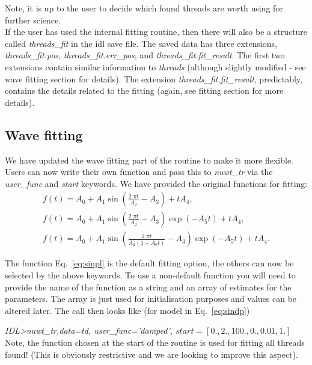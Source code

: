 \documentclass{article}
\begin{document}
Note, it is up to the user to decide which found threads are worth using for further science.\\

If the user has used the internal fitting routine, then there will also be a structure called 
\textit{threads\_fit} in the idl save file. The saved data has three extensions, \textit{threads\_fit.pos}, 
\textit{threads\_fit.err\_pos}, and  \textit{threads\_fit.fit\_result}. The first two extensions contain similar 
information to \textit{threads} (although slightly modified - see wave fitting section for details). The 
extension \textit{threads\_fit.fit\_result}, predictably, contains the details related to the fitting (again, see 
fitting section for more details).


\subsection{Wave fitting}

We have updated the wave fitting part of the routine to make it more flexible. Users can now write their own function and pass this to \textit{nuwt\_tr} via the \textit{user\_func} and \textit{start} keywords. We have provided the original functions for fitting:\\
 
\begin{eqnarray}
f(t)=A_0+A_1\sin\left( \frac{2.\pi t}{A_2}-A_3\right)+tA_4,\label{eq:sinpl}\\
f(t)=A_0+A_1\sin\left( \frac{2.\pi t}{A_2}-A_3\right)\exp(-A_5t)+tA_4,\label{eq:sindp}\\
f(t)=A_0+A_1\sin\left( \frac{2.\pi t}{A_2(1+A_6t)}-A_3\right)\exp(-A_5t)+tA_4.\label{eq:sintdp}
\end{eqnarray}

The function Eq.~\ref{eq:sinpl} is the default fitting option, the others can now be selected by the above keywords. To use a non-default function you will need to provide the name of the function as a string and an array of estimates for the parameters. The array is just used for initialisation purposes and values can be altered later. The call then looks like (for model 
in Eq.~\ref{eq:sindp})

\medskip

\textit{IDL\textgreater nuwt\_tr,data=td, user\_func='damped', $start=[0.,2.,100.,0.,0.01,1.]$} \\


Note, the function chosen at the start of the routine is used for fitting all threads found! (This is obviously restrictive and we are looking to improve this aspect).\\
\end{document}
